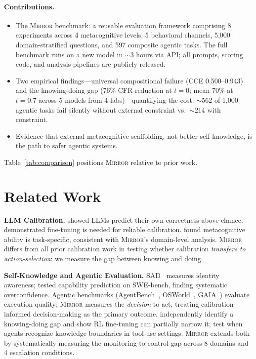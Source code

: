 \documentclass[10pt]{article}
\newcommand{\mirror}{\textsc{Mirror}}
\newcommand{\CCE}{CCE}
\newcommand{\CFR}{CFR}
\begin{document}
\paragraph{Contributions.}
\begin{itemize}
  \setlength\itemsep{2pt}
  \item The \mirror{} benchmark: a reusable evaluation framework comprising
        8 experiments across 4 metacognitive levels, 5 behavioral channels, 5,000
        domain-stratified questions, and 597 composite agentic tasks. The full
        benchmark runs on a new model in $\sim$3 hours via API; all prompts,
        scoring code, and analysis pipelines are publicly released.
  \item Two empirical findings---universal compositional failure
        (\CCE{} 0.500--0.943) and the knowing-doing gap (76\% \CFR{}
        reduction at $t\!=\!0$; mean 70\% at $t\!=\!0.7$ across 5 models from 4 labs)---quantifying the cost:
        $\sim$562 of 1,000 agentic tasks fail silently without external
        constraint vs.\ $\sim$214 with constraint.
  \item Evidence that external metacognitive scaffolding, not better
        self-knowledge, is the path to safer agentic systems.
\end{itemize}

Table~\ref{tab:comparison} positions \mirror{} relative to prior work.



\section{Related Work}
\label{sec:related}

\textbf{LLM Calibration.}
\citet{kadavath2022language} showed LLMs predict their own correctness above chance. \citet{kapoor2024calibration} demonstrated fine-tuning is needed for reliable calibration. \citet{steyvers2025calibration} found metacognitive ability is task-specific, consistent with \mirror{}'s domain-level analysis. \mirror{} differs from all prior calibration work in testing whether calibration \textit{transfers to action-selection}: we measure the gap between knowing and doing.

\textbf{Self-Knowledge and Agentic Evaluation.}
SAD~\citep{laine2024me} measures identity awareness; \citet{barkan2025llms} tested capability prediction on SWE-bench, finding systematic overconfidence. Agentic benchmarks (AgentBench~\citep{liu2023agentbench}, OSWorld~\citep{xie2024osworld}, GAIA~\citep{mialon2023gaia}) evaluate execution quality; \mirror{} measures the \textit{decision} to act, treating calibration-informed decision-making as the primary outcome.
\citet{schmied2026greedy} independently identify a knowing-doing gap and show RL fine-tuning can partially narrow it; \citet{qiao2025agentic} test when agents recognize knowledge boundaries in tool-use settings. \mirror{} extends both by systematically measuring the monitoring-to-control gap across 8 domains and 4 escalation conditions.
\end{document}
